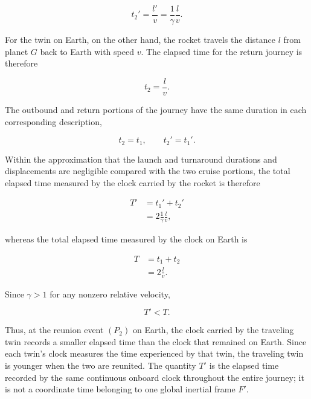 \documentclass[12pt]{article}
\begin{document}
\begin{equation}
  t_2'
  =
  \frac{l'}{v}
  =
  \frac{1}{\gamma}\frac{l}{v}.
  \label{eq:return_time_rocket}
\end{equation}

For the twin on Earth, on the other hand, the rocket travels the distance $l$ from
planet $G$ back to Earth with speed $v$. The elapsed time for the return journey is
therefore

\begin{equation}
  t_2
  =
  \frac{l}{v}.
  \label{eq:return_time_earth}
\end{equation}

The outbound and return portions of the journey have the same duration in each
corresponding description,

\[
  t_2=t_1,
  \qquad
  t_2'=t_1'.
\]

Within the approximation that the launch and turnaround durations and displacements are
negligible compared with the two cruise portions, the total elapsed time measured by the
clock carried by the rocket is therefore

\begin{equation}
  \begin{aligned}
    T'
    &=
    t_1'+t_2'
    \\
    &=
    2\frac{1}{\gamma}\frac{l}{v},
  \end{aligned}
  \label{eq:total_journey_time_rocket}
\end{equation}

whereas the total elapsed time measured by the clock on Earth is

\begin{equation}
  \begin{aligned}
    T
    &=
    t_1+t_2
    \\
    &=
    2\frac{l}{v}.
  \end{aligned}
  \label{eq:total_journey_time_earth}
\end{equation}

Since $\gamma>1$ for any nonzero relative velocity,

\begin{equation}
  T'<T.
  \label{eq:twin_elapsed_time_difference}
\end{equation}

Thus, at the reunion event $(P_2)$ on Earth, the clock carried by the traveling twin
records a smaller elapsed time than the clock that remained on Earth. Since each twin's
clock measures the time experienced by that twin, the traveling twin is younger when
the two are reunited. The quantity $T'$ is the elapsed time recorded by the same continuous
onboard clock throughout the entire journey; it is not a coordinate time belonging to one
global inertial frame $F'$.
 
\end{document}
